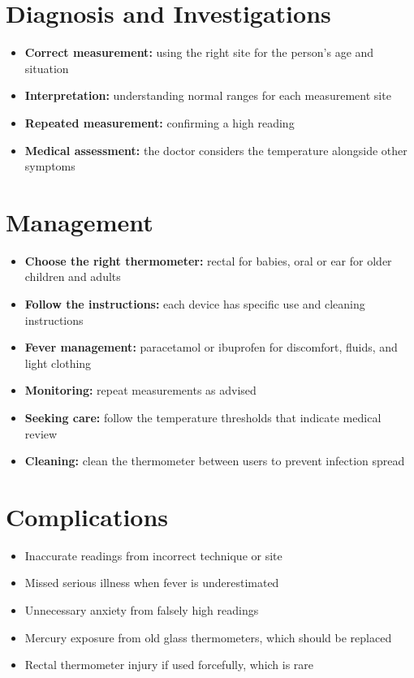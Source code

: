 \section*{Diagnosis and Investigations}
\begin{itemize}
    \item \textbf{Correct measurement:} using the right site for the person's age and situation
    \item \textbf{Interpretation:} understanding normal ranges for each measurement site
    \item \textbf{Repeated measurement:} confirming a high reading
    \item \textbf{Medical assessment:} the doctor considers the temperature alongside other symptoms
\end{itemize}

\section*{Management}
\begin{itemize}
    \item \textbf{Choose the right thermometer:} rectal for babies, oral or ear for older children and adults
    \item \textbf{Follow the instructions:} each device has specific use and cleaning instructions
    \item \textbf{Fever management:} paracetamol or ibuprofen for discomfort, fluids, and light clothing
    \item \textbf{Monitoring:} repeat measurements as advised
    \item \textbf{Seeking care:} follow the temperature thresholds that indicate medical review
    \item \textbf{Cleaning:} clean the thermometer between users to prevent infection spread
\end{itemize}

\section*{Complications}
\begin{itemize}
    \item Inaccurate readings from incorrect technique or site
    \item Missed serious illness when fever is underestimated
    \item Unnecessary anxiety from falsely high readings
    \item Mercury exposure from old glass thermometers, which should be replaced
    \item Rectal thermometer injury if used forcefully, which is rare
\end{itemize}

